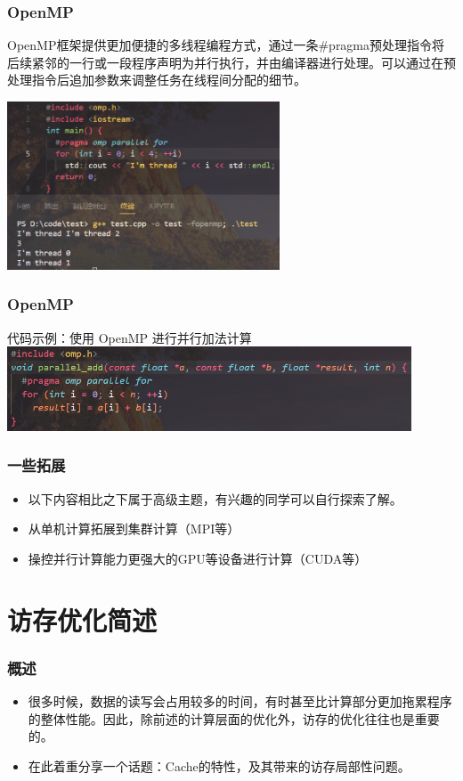\documentclass{beamer}
\begin{document}
\begin{frame}
\frametitle{OpenMP}
OpenMP框架提供更加便捷的多线程编程方式，通过一条#pragma预处理指令将后续紧邻的一行或一段程序声明为并行执行，并由编译器进行处理。可以通过在预处理指令后追加参数来调整任务在线程间分配的细节。

\centering\includegraphics[height=5cm]{openmp.png}
\end{frame}

\begin{frame}
\frametitle{OpenMP}

\begin{block}{代码示例：使用 OpenMP 进行并行加法计算}
\centering\includegraphics[height=2.5cm]{parallel_add.png}
\end{block}
\end{frame}

\begin{frame}
\frametitle{一些拓展}
\begin{itemize}
    \item<1-> 以下内容相比之下属于高级主题，有兴趣的同学可以自行探索了解。
    \item<2-> 从单机计算拓展到集群计算（MPI等）
    \item<3-> 操控并行计算能力更强大的GPU等设备进行计算（CUDA等）
\end{itemize}
\end{frame}

\section{访存优化简述}

\begin{frame}
\frametitle{概述}
\begin{itemize}
    \item<1-> 很多时候，数据的读写会占用较多的时间，有时甚至比计算部分更加拖累程序的整体性能。因此，除前述的计算层面的优化外，访存的优化往往也是重要的。
    \item<2-> 在此着重分享一个话题：Cache的特性，及其带来的访存局部性问题。
\end{itemize}

\end{frame}
\end{document}
